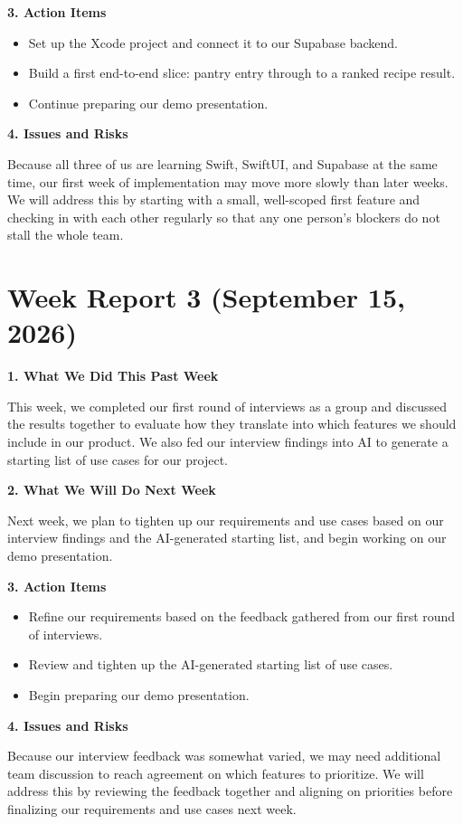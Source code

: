 \noindent\textbf{3. Action Items}
\begin{itemize}
\item Set up the Xcode project and connect it to our Supabase backend.
\item Build a first end-to-end slice: pantry entry through to a ranked recipe result.
\item Continue preparing our demo presentation.
\end{itemize}

\noindent\textbf{4. Issues and Risks}

Because all three of us are learning Swift, SwiftUI, and Supabase at the same time, our first week of implementation may move more slowly than later weeks. We will address this by starting with a small, well-scoped first feature and checking in with each other regularly so that any one person's blockers do not stall the whole team.

\section{Week Report 3 (September 15, 2026)}

\noindent\textbf{1. What We Did This Past Week}

This week, we completed our first round of interviews as a group and discussed the results together to evaluate how they translate into which features we should include in our product. We also fed our interview findings into AI to generate a starting list of use cases for our project.

\noindent\textbf{2. What We Will Do Next Week}

Next week, we plan to tighten up our requirements and use cases based on our interview findings and the AI-generated starting list, and begin working on our demo presentation.

\noindent\textbf{3. Action Items}
\begin{itemize}
\item Refine our requirements based on the feedback gathered from our first round of interviews.
\item Review and tighten up the AI-generated starting list of use cases.
\item Begin preparing our demo presentation.
\end{itemize}

\noindent\textbf{4. Issues and Risks}

Because our interview feedback was somewhat varied, we may need additional team discussion to reach agreement on which features to prioritize. We will address this by reviewing the feedback together and aligning on priorities before finalizing our requirements and use cases next week.

